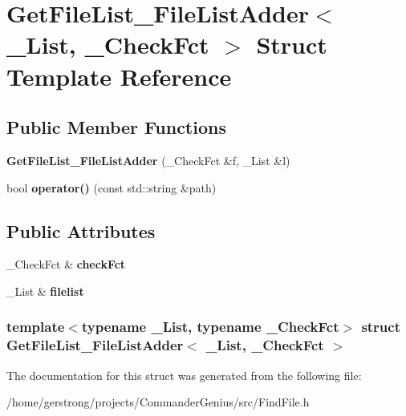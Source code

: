 \hypertarget{struct_get_file_list___file_list_adder}{
\section{GetFileList\_\-FileListAdder$<$ \_\-List, \_\-CheckFct $>$ Struct Template Reference}
\label{struct_get_file_list___file_list_adder}
}
\subsection*{Public Member Functions}
\begin{DoxyCompactItemize}
\item 
\hypertarget{struct_get_file_list___file_list_adder_a1a7cb1b640c4eecbc54d46f6c99111ca}{
{\bfseries GetFileList\_\-FileListAdder} (\_\-CheckFct \&f, \_\-List \&l)}
\label{struct_get_file_list___file_list_adder_a1a7cb1b640c4eecbc54d46f6c99111ca}

\item 
\hypertarget{struct_get_file_list___file_list_adder_a0febc886858649d6f12c4750bb6c6d66}{
bool {\bfseries operator()} (const std::string \&path)}
\label{struct_get_file_list___file_list_adder_a0febc886858649d6f12c4750bb6c6d66}

\end{DoxyCompactItemize}
\subsection*{Public Attributes}
\begin{DoxyCompactItemize}
\item 
\hypertarget{struct_get_file_list___file_list_adder_a754da447cf80e2c4f3dae8ade5b6d701}{
\_\-CheckFct \& {\bfseries checkFct}}
\label{struct_get_file_list___file_list_adder_a754da447cf80e2c4f3dae8ade5b6d701}

\item 
\hypertarget{struct_get_file_list___file_list_adder_ae7385e88adfb401d3ac15219fc04b4a8}{
\_\-List \& {\bfseries filelist}}
\label{struct_get_file_list___file_list_adder_ae7385e88adfb401d3ac15219fc04b4a8}

\end{DoxyCompactItemize}
\subsubsection*{template$<$typename \_\-List, typename \_\-CheckFct$>$ struct GetFileList\_\-FileListAdder$<$ \_\-List, \_\-CheckFct $>$}



The documentation for this struct was generated from the following file:\begin{DoxyCompactItemize}
\item 
/home/gerstrong/projects/CommanderGenius/src/FindFile.h\end{DoxyCompactItemize}
